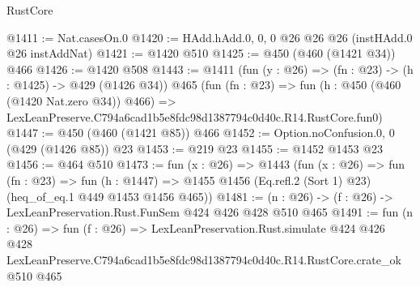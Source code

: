 \begin{lexlean}{RustCore}
\begin{coremodule}
@1411 := Nat.casesOn.{0}
@1420 := HAdd.hAdd.{0, 0, 0} @26 @26 @26 (instHAdd.{0} @26 instAddNat)
@1421 := @1420 @510
@1425 := @450 (@460 (@1421 @34)) @466
@1426 := @1420 @508
@1443 := @1411
    (fun (y : @26) => (fn : @23) -> (h : @1425) -> @429 (@1426 @34))
    @465
    (fun (fn : @23) =>
    fun (h : @450 (@460 (@1420 Nat.zero @34)) @466) =>
    LexLeanPreserve.C794a6cad1b5e8fdc98d1387794c0d40c.R14.RustCore.fun0)
@1447 := @450 (@460 (@1421 @85)) @466
@1452 := Option.noConfusion.{0, 0} (@429 (@1426 @85)) @23
@1453 := @219 @23
@1455 := @1452 @1453 @23
@1456 := @464 @510
@1473 := fun (x : @26) =>
  @1443
    (fun (x : @26) =>
    fun (fn : @23) =>
    fun (h : @1447) => @1455 @1456 (Eq.refl.{2} (Sort 1) @23) (heq_of_eq.{1} @449 @1453 @1456 @465))
@1481 := (n : @26) -> (f : @26) -> LexLeanPreservation.Rust.FunSem @424 @426 @428 @510 @465
@1491 := fun (n : @26) =>
  fun (f : @26) =>
  LexLeanPreservation.Rust.simulate
    @424
    @426
    @428
    LexLeanPreserve.C794a6cad1b5e8fdc98d1387794c0d40c.R14.RustCore.crate_ok
    @510
    @465
\end{coremodule}
\end{lexlean}

